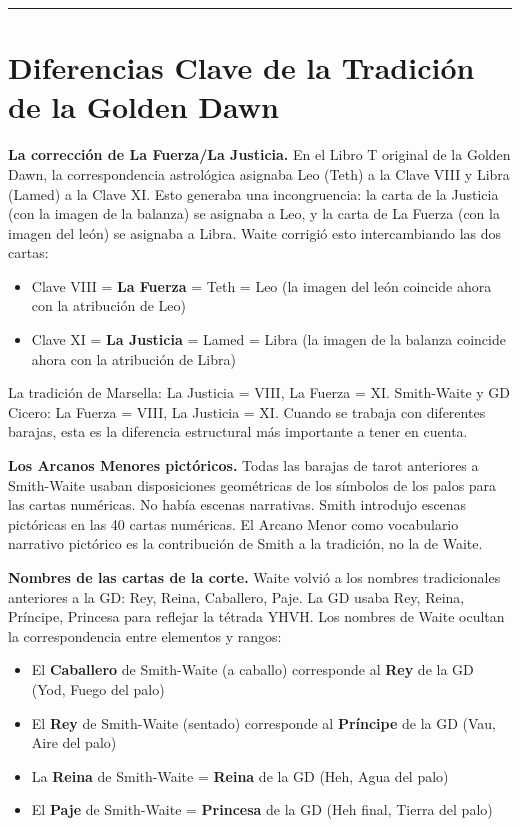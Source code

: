\begin{center}\rule{0.5\linewidth}{0.5pt}\end{center}

\section{Diferencias Clave de la Tradición de la Golden Dawn}\label{key-departures-from-the-golden-dawn-tradition}

\textbf{La corrección de La Fuerza/La Justicia.} En el Libro T original de la Golden Dawn, la correspondencia astrológica asignaba Leo (Teth) a la Clave VIII y Libra (Lamed) a la Clave XI. Esto generaba una incongruencia: la carta de la Justicia (con la imagen de la balanza) se asignaba a Leo, y la carta de La Fuerza (con la imagen del león) se asignaba a Libra. Waite corrigió esto intercambiando las dos cartas:

\begin{itemize}
\tightlist
\item
  Clave VIII = \textbf{La Fuerza} = Teth = Leo (la imagen del león coincide ahora con la atribución de Leo)
\item
  Clave XI = \textbf{La Justicia} = Lamed = Libra (la imagen de la balanza coincide ahora con la atribución de Libra)
\end{itemize}

La tradición de Marsella: La Justicia = VIII, La Fuerza = XI. Smith-Waite y GD Cicero: La Fuerza = VIII, La Justicia = XI. Cuando se trabaja con diferentes barajas, esta es la diferencia estructural más importante a tener en cuenta.

\textbf{Los Arcanos Menores pictóricos.} Todas las barajas de tarot anteriores a Smith-Waite usaban disposiciones geométricas de los símbolos de los palos para las cartas numéricas. No había escenas narrativas. Smith introdujo escenas pictóricas en las 40 cartas numéricas. El Arcano Menor como vocabulario narrativo pictórico es la contribución de Smith a la tradición, no la de Waite.

\textbf{Nombres de las cartas de la corte.} Waite volvió a los nombres tradicionales anteriores a la GD: Rey, Reina, Caballero, Paje. La GD usaba Rey, Reina, Príncipe, Princesa para reflejar la tétrada YHVH. Los nombres de Waite ocultan la correspondencia entre elementos y rangos:

\begin{itemize}
\tightlist
\item
  El \textbf{Caballero} de Smith-Waite (a caballo) corresponde al \textbf{Rey} de la GD (Yod, Fuego del palo)
\item
  El \textbf{Rey} de Smith-Waite (sentado) corresponde al \textbf{Príncipe} de la GD (Vau, Aire del palo)
\item
  La \textbf{Reina} de Smith-Waite = \textbf{Reina} de la GD (Heh, Agua del palo)
\item
  El \textbf{Paje} de Smith-Waite = \textbf{Princesa} de la GD (Heh final, Tierra del palo)
\end{itemize}

